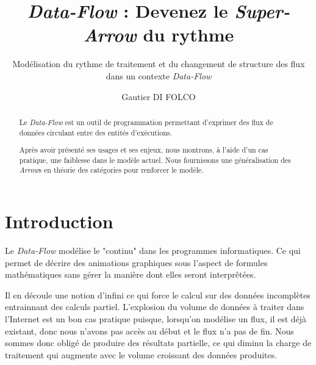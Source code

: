\documentclass{llncs}
\newcommand{\DF}{\emph{Data-Flow} }
\newcommand{\SA}{\emph{Super-Arrow} }
\newcommand{\Arrs}{\emph{Arrow}s }
\begin{document}
\title{\DF : Devenez le \SA du rythme}


\subtitle{Modélisation du rythme de traitement et du changement de structure des flux dans un contexte \DF}


\author{Gautier DI FOLCO}







\maketitle

\begin{abstract}
Le \DF est un outil de programmation permettant d'exprimer des flux de
données circulant entre des entités d'exécutions.

Après avoir présenté ses usages et ses enjeux, nous montrons, à l'aide d'un
cas pratique, une faiblesse dans le modèle actuel.
Nous fournissons une généralisation des \Arrs en théorie des catégories pour
renforcer le modèle.
\end{abstract}

\section{Introduction}
Le \DF modélise le "continu" dans les programmes informatiques.
Ce qui permet de décrire des animations graphiques sous l'aspect de formules mathématiques
sans gérer la manière dont elles seront interprêtées.

Il en découle une notion d'infini ce qui force le calcul sur des données incomplètes
entrainnant des calculs partiel.
L'explosion du volume de données à traiter dans l'Internet est un bon cas pratique
puisque, lorsqu'on modélise un flux, il est déjà existant, donc nous n'avons pas
accès au début et le flux n'a pas de fin. Nous sommes donc obligé de produire
des résultats partielle, ce qui diminu la charge de traitement qui augmente
avec le volume croissant des données produites.
\end{document}
